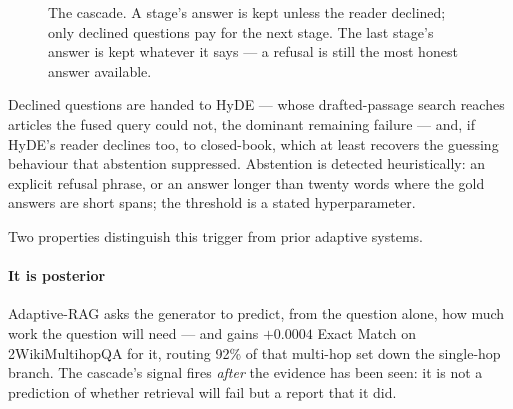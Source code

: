 \begin{figure}[t]
\centering
{}
\caption{The cascade. A stage's answer is kept unless the reader declined;
only declined questions pay for the next stage. The last stage's answer is
kept whatever it says --- a refusal is still the most honest answer
available.}
\label{fig:arch-cascade}
\end{figure}

Declined questions are handed to HyDE --- whose drafted-passage search
reaches articles the fused query could not, the dominant remaining failure
--- and, if HyDE's reader declines too, to closed-book, which at least
recovers the guessing behaviour that abstention suppressed. Abstention is
detected heuristically: an explicit refusal phrase, or an answer longer
than twenty words where the gold answers are short spans; the threshold is
a stated hyperparameter.

Two properties distinguish this trigger from prior adaptive systems.

\paragraph{It is posterior} Adaptive-RAG asks the generator to predict,
from the question alone, how much work the question will need --- and
gains $+0.0004$ Exact Match on 2WikiMultihopQA for it, routing 92\% of
that multi-hop set down the single-hop branch. The cascade's signal fires
\emph{after} the evidence has been seen: it is not a prediction of whether
retrieval will fail but a report that it did.

